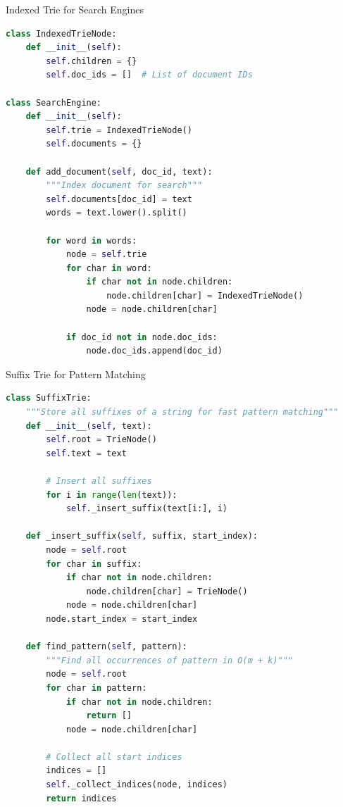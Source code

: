 \documentclass[aspectratio=169]{beamer}
\begin{document}
\begin{frame}[fragile]{Indexed Trie for Search Engines}
  \begin{lstlisting}[language=Python, basicstyle=\ttfamily\footnotesize]
class IndexedTrieNode:
    def __init__(self):
        self.children = {}
        self.doc_ids = []  # List of document IDs

class SearchEngine:
    def __init__(self):
        self.trie = IndexedTrieNode()
        self.documents = {}

    def add_document(self, doc_id, text):
        """Index document for search"""
        self.documents[doc_id] = text
        words = text.lower().split()

        for word in words:
            node = self.trie
            for char in word:
                if char not in node.children:
                    node.children[char] = IndexedTrieNode()
                node = node.children[char]

            if doc_id not in node.doc_ids:
                node.doc_ids.append(doc_id)
  \end{lstlisting}
\end{frame}

\begin{frame}[fragile]{Suffix Trie for Pattern Matching}
  \begin{lstlisting}[language=Python, basicstyle=\ttfamily\footnotesize]
class SuffixTrie:
    """Store all suffixes of a string for fast pattern matching"""
    def __init__(self, text):
        self.root = TrieNode()
        self.text = text

        # Insert all suffixes
        for i in range(len(text)):
            self._insert_suffix(text[i:], i)

    def _insert_suffix(self, suffix, start_index):
        node = self.root
        for char in suffix:
            if char not in node.children:
                node.children[char] = TrieNode()
            node = node.children[char]
        node.start_index = start_index

    def find_pattern(self, pattern):
        """Find all occurrences of pattern in O(m + k)"""
        node = self.root
        for char in pattern:
            if char not in node.children:
                return []
            node = node.children[char]

        # Collect all start indices
        indices = []
        self._collect_indices(node, indices)
        return indices
  \end{lstlisting}
\end{frame}
\end{document}
